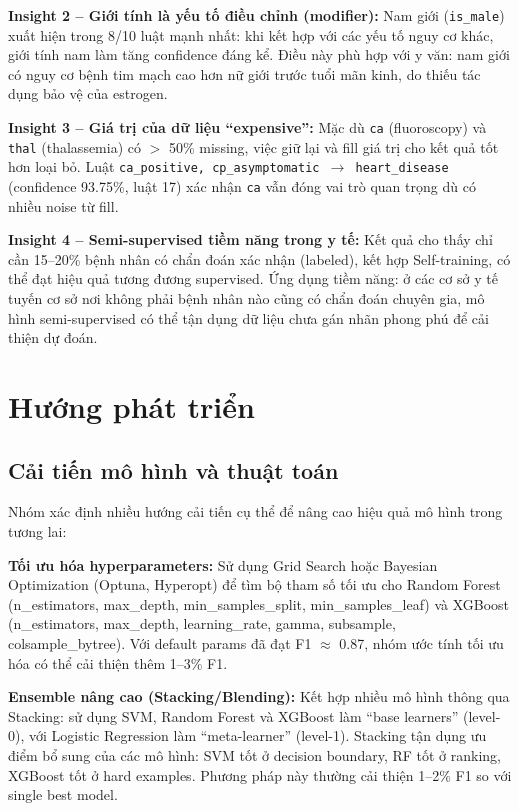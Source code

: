 \textbf{Insight 2 -- Giới tính là yếu tố điều chỉnh (modifier):} Nam giới (\texttt{is\_male}) xuất hiện trong 8/10 luật mạnh nhất: khi kết hợp với các yếu tố nguy cơ khác, giới tính nam làm tăng confidence đáng kể. Điều này phù hợp với y văn: nam giới có nguy cơ bệnh tim mạch cao hơn nữ giới trước tuổi mãn kinh, do thiếu tác dụng bảo vệ của estrogen.

\textbf{Insight 3 -- Giá trị của dữ liệu ``expensive'':} Mặc dù \texttt{ca} (fluoroscopy) và \texttt{thal} (thalassemia) có $>$ 50\% missing, việc giữ lại và fill giá trị cho kết quả tốt hơn loại bỏ. Luật \texttt{ca\_positive, cp\_asymptomatic $\rightarrow$ heart\_disease} (confidence 93.75\%, luật 17) xác nhận \texttt{ca} vẫn đóng vai trò quan trọng dù có nhiều noise từ fill.

\textbf{Insight 4 -- Semi-supervised tiềm năng trong y tế:} Kết quả cho thấy chỉ cần 15--20\% bệnh nhân có chẩn đoán xác nhận (labeled), kết hợp Self-training, có thể đạt hiệu quả tương đương supervised. Ứng dụng tiềm năng: ở các cơ sở y tế tuyến cơ sở nơi không phải bệnh nhân nào cũng có chẩn đoán chuyên gia, mô hình semi-supervised có thể tận dụng dữ liệu chưa gán nhãn phong phú để cải thiện dự đoán.

\section{Hướng phát triển}

\subsection{Cải tiến mô hình và thuật toán}

Nhóm xác định nhiều hướng cải tiến cụ thể để nâng cao hiệu quả mô hình trong tương lai:

\textbf{Tối ưu hóa hyperparameters:} Sử dụng Grid Search hoặc Bayesian Optimization (Optuna, Hyperopt) để tìm bộ tham số tối ưu cho Random Forest (n\_estimators, max\_depth, min\_samples\_split, min\_samples\_leaf) và XGBoost (n\_estimators, max\_depth, learning\_rate, gamma, subsample, colsample\_bytree). Với default params đã đạt F1 $\approx$ 0.87, nhóm ước tính tối ưu hóa có thể cải thiện thêm 1--3\% F1.

\textbf{Ensemble nâng cao (Stacking/Blending):} Kết hợp nhiều mô hình thông qua Stacking: sử dụng SVM, Random Forest và XGBoost làm ``base learners'' (level-0), với Logistic Regression làm ``meta-learner'' (level-1). Stacking tận dụng ưu điểm bổ sung của các mô hình: SVM tốt ở decision boundary, RF tốt ở ranking, XGBoost tốt ở hard examples. Phương pháp này thường cải thiện 1--2\% F1 so với single best model.

